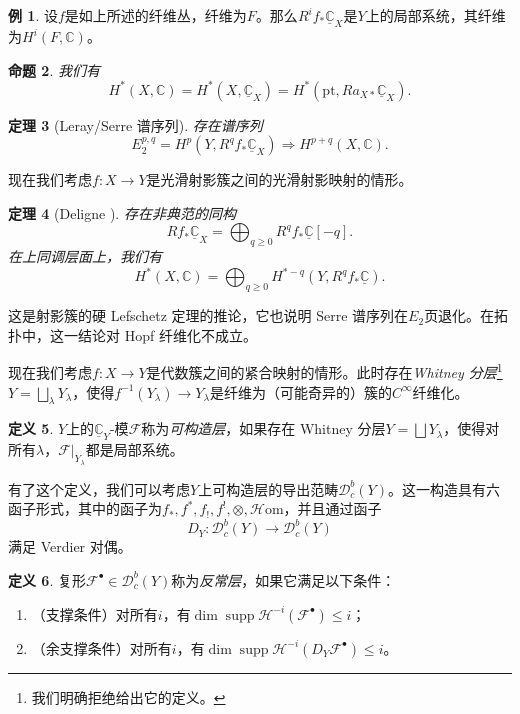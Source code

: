 \documentclass{amsart}
\newtheorem{thm}{定理}[section]
\newtheorem{prop}[thm]{命题}
\theoremstyle{definition}
\newtheorem{defn}[thm]{定义}
\newtheorem{exm}[thm]{例}
\theoremstyle{remark}
\theoremstyle{plain}
\theoremstyle{definition}
\theoremstyle{remark}
\newcommand{\C}{\mathbb{C}}
\newcommand{\mc}[1]{\mathcal{#1}}
\newcommand{\mr}[1]{\mathrm{#1}}
\newcommand{\on}[1]{\operatorname{#1}}
\newcommand{\ul}[1]{\underline{#1}}
\newcommand{\1}{\mathbf{1}}
\newcommand{\2}{\mathbf{2}}
\newcommand{\3}{\mathbf{3}}
\begin{document}
\begin{exm}
    设\(f\)是如上所述的纤维丛，纤维为\(F\)。那么\(R^i f_* \ul{\C}_X\)是\(Y\)上的局部系统，其纤维为\(H^i(F, \C)\)。
\end{exm}

\begin{prop}
    我们有
    \[ H^*(X, \C) = H^*(X, \ul{\C}_X) = H^*(\mr{pt}, R a_{X*} \ul{\C}_X). \]
\end{prop}

\begin{thm}[Leray/Serre 谱序列]
    存在谱序列
    \[ E_2^{p,q} = H^p(Y, R^q f_* \ul{\C}_X) \Rightarrow H^{p+q}(X, \C). \]
\end{thm}

现在我们考虑\(f \colon X \to Y\)是光滑射影簇之间的光滑射影映射的情形。

\begin{thm}[Deligne {\cite{Deligne1968}}]
    存在非典范的同构
    \[ R f_* \ul{\C}_X = \bigoplus_{q \geq 0} R^q f_* \ul{\C}[-q]. \]
    在上同调层面上，我们有
    \[ H^*(X, \C) = \bigoplus_{q \geq 0} H^{*-q}(Y, R^q f_* \ul{\C}). \]
\end{thm}

这是射影簇的硬 Lefschetz 定理的推论，它也说明 Serre 谱序列在\(E_2\)页退化。在拓扑中，这一结论对 Hopf 纤维化不成立。

现在我们考虑\(f \colon X \to Y\)是代数簇之间的紧合映射的情形。此时存在\textit{Whitney 分层}\footnote{我们明确拒绝给出它的定义。}\(Y = \bigsqcup_{\lambda} Y_{\lambda}\)，使得\(f^{-1}(Y_{\lambda}) \to Y_{\lambda}\)是纤维为（可能奇异的）簇的\(C^{\infty}\)纤维化。

\begin{defn}
    \(Y\)上的\(\ul{\C}_Y\)-模\(\mc{F}\)称为\textit{可构造层}，如果存在 Whitney 分层\(Y = \bigsqcup Y_{\lambda}\)，使得对所有\(\lambda\)，\(\mc{F}|_{Y_{\lambda}}\)都是局部系统。
\end{defn}

有了这个定义，我们可以考虑\(Y\)上可构造层的导出范畴\(\mc{D}_c^b(Y)\)。这一构造具有六函子形式，其中的函子为\(f_*, f^*, f_!, f^!, \otimes, \mc{H}\mr{om}\)，并且通过函子
\[ D_Y \colon \mc{D}_c^b(Y) \to \mc{D}_c^b(Y) \]
满足 Verdier 对偶。

\begin{defn}
    复形\(\mc{F}^{\bullet} \in \mc{D}_c^b(Y)\)称为\textit{反常层}，如果它满足以下条件：
    \begin{enumerate}
        \item （支撑条件）对所有\(i\)，有\(\dim \on{supp} \mc{H}^{-i}(\mc{F}^{\bullet}) \leq i\)；
        \item （余支撑条件）对所有\(i\)，有\(\dim \on{supp} \mc{H}^{-i}(D_Y \mc{F}^{\bullet}) \leq i\)。
    \end{enumerate}
\end{defn}
\end{document}
